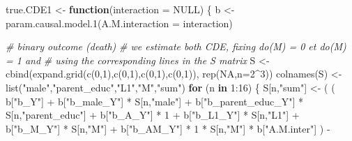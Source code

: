 \documentclass[
]{book}
\newenvironment{Shaded}{\begin{snugshade}}{\end{snugshade}}
\newcommand{\AttributeTok}[1]{\textcolor[rgb]{0.77,0.63,0.00}{#1}}
\newcommand{\CommentTok}[1]{\textcolor[rgb]{0.56,0.35,0.01}{\textit{#1}}}
\newcommand{\ConstantTok}[1]{\textcolor[rgb]{0.00,0.00,0.00}{#1}}
\newcommand{\ControlFlowTok}[1]{\textcolor[rgb]{0.13,0.29,0.53}{\textbf{#1}}}
\newcommand{\DecValTok}[1]{\textcolor[rgb]{0.00,0.00,0.81}{#1}}
\newcommand{\FunctionTok}[1]{\textcolor[rgb]{0.00,0.00,0.00}{#1}}
\newcommand{\NormalTok}[1]{#1}
\newcommand{\OtherTok}[1]{\textcolor[rgb]{0.56,0.35,0.01}{#1}}
\newcommand{\SpecialCharTok}[1]{\textcolor[rgb]{0.00,0.00,0.00}{#1}}
\newcommand{\StringTok}[1]{\textcolor[rgb]{0.31,0.60,0.02}{#1}}
\begin{document}
\begin{Shaded}
\begin{Highlighting}[]
\NormalTok{true.CDE1 }\OtherTok{\textless{}{-}} \ControlFlowTok{function}\NormalTok{(}\AttributeTok{interaction =} \ConstantTok{NULL}\NormalTok{) \{}
\NormalTok{  b }\OtherTok{\textless{}{-}} \FunctionTok{param.causal.model.1}\NormalTok{(}\AttributeTok{A.M.interaction =}\NormalTok{ interaction)}
  
  \CommentTok{\# binary outcome (death)}
  \CommentTok{\# we estimate both CDE, fixing do(M) = 0 et do(M) = 1 and }
  \CommentTok{\# using the corresponding lines in the S matrix}
\NormalTok{  S }\OtherTok{\textless{}{-}} \FunctionTok{cbind}\NormalTok{(}\FunctionTok{expand.grid}\NormalTok{(}\FunctionTok{c}\NormalTok{(}\DecValTok{0}\NormalTok{,}\DecValTok{1}\NormalTok{),}\FunctionTok{c}\NormalTok{(}\DecValTok{0}\NormalTok{,}\DecValTok{1}\NormalTok{),}\FunctionTok{c}\NormalTok{(}\DecValTok{0}\NormalTok{,}\DecValTok{1}\NormalTok{),}\FunctionTok{c}\NormalTok{(}\DecValTok{0}\NormalTok{,}\DecValTok{1}\NormalTok{)), }\FunctionTok{rep}\NormalTok{(}\ConstantTok{NA}\NormalTok{,}\AttributeTok{n=}\DecValTok{2}\SpecialCharTok{\^{}}\DecValTok{3}\NormalTok{))}
  \FunctionTok{colnames}\NormalTok{(S) }\OtherTok{\textless{}{-}} \FunctionTok{list}\NormalTok{(}\StringTok{"male"}\NormalTok{,}\StringTok{"parent\_educ"}\NormalTok{,}\StringTok{"L1"}\NormalTok{,}\StringTok{"M"}\NormalTok{,}\StringTok{"sum"}\NormalTok{)}
  \ControlFlowTok{for}\NormalTok{ (n }\ControlFlowTok{in} \DecValTok{1}\SpecialCharTok{:}\DecValTok{16}\NormalTok{) \{}
\NormalTok{    S[n,}\StringTok{"sum"}\NormalTok{] }\OtherTok{\textless{}{-}}\NormalTok{ ( ( b[}\StringTok{"b\_Y"}\NormalTok{] }\SpecialCharTok{+} 
\NormalTok{                        b[}\StringTok{"b\_male\_Y"}\NormalTok{] }\SpecialCharTok{*}\NormalTok{ S[n,}\StringTok{"male"}\NormalTok{] }\SpecialCharTok{+} 
\NormalTok{                        b[}\StringTok{"b\_parent\_educ\_Y"}\NormalTok{] }\SpecialCharTok{*}\NormalTok{ S[n,}\StringTok{"parent\_educ"}\NormalTok{] }\SpecialCharTok{+} 
\NormalTok{                        b[}\StringTok{"b\_A\_Y"}\NormalTok{] }\SpecialCharTok{*} \DecValTok{1} \SpecialCharTok{+} 
\NormalTok{                        b[}\StringTok{"b\_L1\_Y"}\NormalTok{] }\SpecialCharTok{*}\NormalTok{ S[n,}\StringTok{"L1"}\NormalTok{] }\SpecialCharTok{+}
\NormalTok{                        b[}\StringTok{"b\_M\_Y"}\NormalTok{] }\SpecialCharTok{*}\NormalTok{ S[n,}\StringTok{"M"}\NormalTok{] }\SpecialCharTok{+}
\NormalTok{                        b[}\StringTok{"b\_AM\_Y"}\NormalTok{] }\SpecialCharTok{*} \DecValTok{1} \SpecialCharTok{*}\NormalTok{ S[n,}\StringTok{"M"}\NormalTok{] }\SpecialCharTok{*}\NormalTok{ b[}\StringTok{"A.M.inter"}\NormalTok{] ) }\SpecialCharTok{{-}} 

\end{Highlighting}
\end{Shaded}
\end{document}
